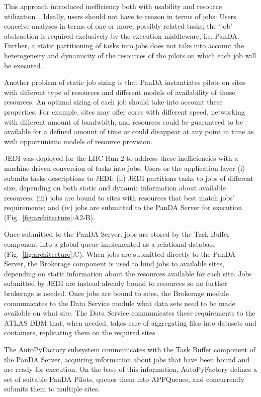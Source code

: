 This approach introduced inefficiency both with usability and resource
utilization~\cite{borodin2015unified}. Ideally, users should not have to reason
in terms of jobs: Users conceive analyses in terms of one or more, possibly
related tasks; the `job' abstraction is required exclusively by the execution
middleware, i.e. PanDA. Further, a static partitioning of tasks into jobs does
not take into account the heterogeneity and dynamicity of the resources of the
pilots on which each job will be executed.

Another problem of static job sizing is that PanDA instantiates pilots on sites
with different type of resources and different models of availability of those
resources. An optimal sizing of each job should take into account these
properties. For example, sites may offer cores with different speed, networking
with different amount of bandwidth, and resources could be guaranteed to be
available for a defined amount of time or could disappear at any point in time
as with opportunistic models of resource provision.

JEDI was deployed for the LHC Run 2 to address these inefficiencies with a
machine-driven conversion of tasks into jobs. Users or the application layer (i)
submits tasks descriptions to JEDI; (ii) JEDI partitions tasks to jobs of
different size, depending on both static and dynamic information about available
resources; (iii) jobs are bound to sites with resources that best match jobs'
requirements; and (iv) jobs are submitted to the PanDA Server for execution
(Fig.~\ref{fig:architecture}:A2-B).

Once submitted to the PanDA Server, jobs are stored by the Task Buffer component
into a global queue implemented as a relational database
(Fig.~\ref{fig:architecture}:C). When jobs are submitted directly to the PanDA
Server, the Brokerage component is used to bind jobs to available sites,
depending on static information about the resources available for each site.
Jobs submitted by JEDI are instead already bound to resources so no further
brokerage is needed. Once jobs are bound to sites, the Brokerage module
communicates to the Data Service module what data sets need to be made available
on what site. The Data Service communicates these requirements to the ATLAS DDM
that, when needed, takes care of aggregating files into datasets and containers,
replicating them on the required sites.

The AutoPyFactory subsystem communicates with the Task Buffer component of the
PanDA Server, acquiring information about jobs that have been bound and are
ready for execution. On the base of this information, AutoPyFactory defines a
set of suitable PanDA Pilots, queues them into APFQueues, and concurrently
submits them to multiple sites.

